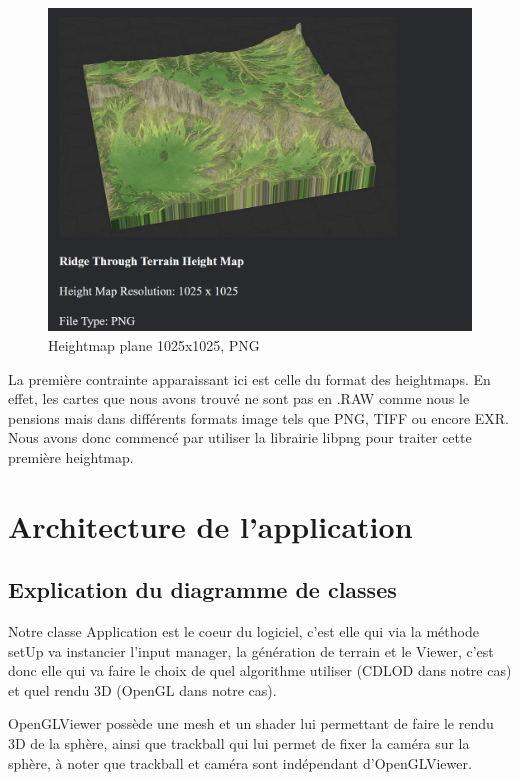 \documentclass[12pt]{report}
\begin{document}
\begin{figure}[h]
    \centering
    \includegraphics[scale = 0.7]{images/simple_heightmap_1025.PNG}
    \caption{Heightmap plane 1025x1025, PNG}
\end{figure}

\newpage

La première contrainte apparaissant ici est celle du format des heightmaps. En effet, les cartes que nous avons trouvé ne sont pas en .RAW comme nous le pensions mais dans différents formats image tels que PNG, TIFF ou encore EXR. Nous avons donc commencé par utiliser la librairie libpng pour traiter cette première heightmap.

\chapter{Architecture de l'application}
\section{Explication du diagramme de classes}
Notre classe Application est le coeur du logiciel, c’est elle qui via la méthode setUp va instancier l’input manager, la génération de terrain et le Viewer, c’est donc elle qui va faire le choix de quel algorithme utiliser (CDLOD dans notre cas) et quel rendu 3D (OpenGL dans notre cas).

OpenGLViewer possède une mesh et un shader lui permettant de faire le rendu 3D de la sphère, ainsi que trackball qui lui permet de fixer la caméra sur la sphère, à noter que trackball et caméra sont indépendant d’OpenGLViewer.
\end{document}
